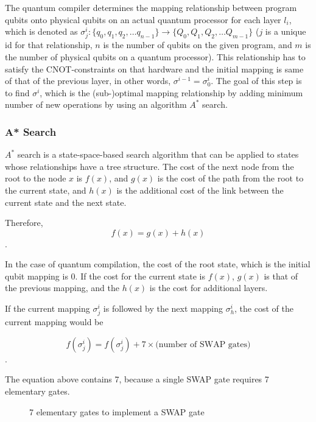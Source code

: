 The quantum compiler determines the mapping relationship between program qubits onto physical qubits on an actual quantum processor for each layer $l_i$, which is denoted as $\sigma^i_j: \{q_0, q_1, q_2, \dots q_{n-1}\} \rightarrow \{Q_0, Q_1, Q_2, \dots Q_{m-1}\}$ ($j$ is a unique id for that relationship, $n$ is the number of qubits on the given program, and $m$ is the number of physical qubits on a quantum processor). This relationship has to satisfy the CNOT-constraints on that hardware and the initial mapping is same of that of the previous layer, in other words, $\sigma^{i-1} = \sigma^i_0$.  The goal of this step is to find $\sigma^{i}$, which is the (sub-)optimal mapping relationship by adding minimum number of new operations by using an algorithm $A^{*}$ search.

\subsubsection{A* Search}
$A^{*}$ search is a state-space-based search algorithm that can be applied to states whose relationships have a tree structure.  The cost of the next node from the root to the node $x$ is $f(x)$, and $g(x)$ is the cost of the path from the root to the current state, and $h(x)$ is the additional cost of the link between the current state and the next state.　


Therefore, 
\begin{equation}
f(x) = g(x) + h(x)
\end{equation}.

In the case of quantum compilation, the cost of the root state, which is the initial qubit mapping is 0. If the cost for the current state is $f(x)$, $g(x)$ is that of the previous mapping, and the $h(x)$ is the cost for additional layers.

If the current mapping $\sigma^i_j$ is followed by the next mapping  $\sigma^i_h$, the cost of the current mapping would be

\begin{equation}
 f(\sigma^i_j) = f(\sigma^i_j) + 7 \times \textrm{(number of SWAP gates)} 
\end{equation}.

The equation above contains 7, because a single SWAP gate requires 7 elementary gates.

\begin{figure}[ht]
	\begin{center}
		\caption{7 elementary gates to implement a SWAP gate}
	\end{center}
\end{figure}

